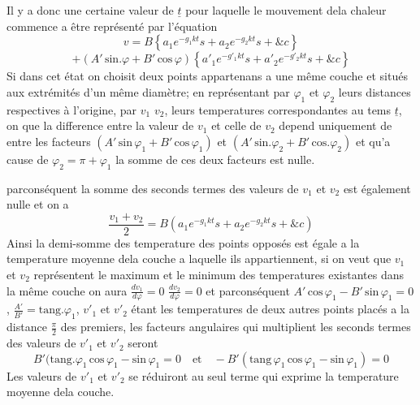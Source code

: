 \documentclass[11pt,a4paper]{article}
\begin{document}
Il y a donc une certaine valeur de $\underline{t}$ pour laquelle
le mouvement dela chaleur commence a être 
représenté par l'équation
\[ v = B\left\{a_1e^{-g_1kt}s + a_2e^{-g_2kt}s + \&c\right\} \]
\[ + (A'\,\text{sin}.\varphi + B'\,\text{cos}\,\varphi)\left\{a'_1e^{-g'_1kt}s + a'_2e^{-g'_2kt}s + \&c\right\} \]
Si dans cet état on choisit deux points appartenans
a une même couche et situés aux extrémités d'un même
diamètre; en représentant par $\varphi_1$ et $\varphi_2$ leurs distances
respectives à l'origine, par $v_1$ $v_2$, leurs temperatures
correspondantes au tems $\underline{t}$, on    que la difference
entre la valeur de $v_1$ et celle de $v_2$ depend uniquement
de   entre  les facteurs $(A'\,\text{sin}\,\varphi_1 + B'\,\text{cos}\,\varphi_1)$
et $(A'\,\text{sin}.\varphi_2 + B'\,\text{cos}.\varphi_2)$ et qu'a cause de $\varphi_2 = \pi + \varphi_1$
la somme de ces deux facteurs est nulle.


parconséquent la somme des seconds termes des valeurs de
$v_1$ et $v_2$ est également nulle et on a
\[ \frac{v_1+v_2}{2} = B\left(a_1e^{-g_1kt}s + a_2e^{-g_2kt}s + \&c\right) \]
Ainsi la demi-somme des temperature des points opposés est égale
a la temperature moyenne dela couche a laquelle ils appartiennent,
si on veut que $v_1$ et $v_2$ représentent le maximum et le minimum
des temperatures existantes dans la même couche on aura
$\frac{dv_1}{d\varphi} = 0$ $\frac{dv_2}{d\varphi} = 0$ et parconséquent $A'\,\text{cos}\,\varphi_1 - B'\,\text{sin}\,\varphi_1 = 0$, $\frac{A'}{B'} = \text{tang}.\varphi_1$,
$v'_1$ et $v'_2$ étant les temperatures de deux autres points placés a la
distance $\frac{\pi}{2}$ des premiers, les facteurs angulaires qui multiplient
les seconds termes des valeurs de $v'_1$ et $v'_2$ seront
\[ B'(\text{tang}.\varphi_1\,\text{cos}\,\varphi_1 - \text{sin}\,\varphi_1 = 0 \quad\text{et}\quad - B'(\text{tang}\,\varphi_1\,\text{cos}\,\varphi_1 - \text{sin}\,\varphi_1) = 0 \]
Les valeurs de $v'_1$ et $v'_2$ se réduiront  au seul terme qui
exprime la temperature moyenne dela couche.
\end{document}
